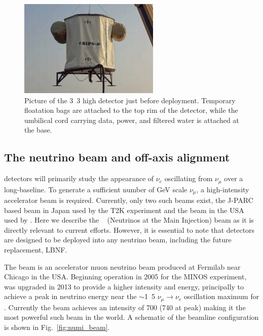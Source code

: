 \begin{figure} %
    \includegraphics[width=0.6\textwidth]{diagrams/4-chips/chips_m.png}
    \caption[Picture of the \chipsm detector]
    {Picture of the \unit{3.3}{} high \chipsm detector just before deployment. Temporary
        floatation bags are attached to the top rim of the detector, while the umbilical cord
        carrying data, power, and filtered water is attached at the base.}
    \label{fig:chips_m}
\end{figure}

\subsection{The neutrino beam and off-axis alignment} %
\label{sec:chips_concept_beam} %

\chips detectors will primarily study the appearance of $\nu_{e}$ oscillating from $\nu_{\mu}$
over a long-baseline. To generate a sufficient number of GeV scale $\nu_{\mu}$, a high-intensity
accelerator beam is required. Currently, only two such beams exist, the J-PARC based beam in Japan
used by the T2K experiment and the \numi beam in the USA used by \nova. Here we describe the
\numi~\cite{adamson2016} (Neutrinos at the Main Injection) beam as it is directly relevant to
current \chips efforts. However, it is essential to note that \chips detectors are designed to be
deployed into any neutrino beam, including the future \numi replacement, LBNF.

The \numi beam is an accelerator muon neutrino beam produced at Fermilab near Chicago in the USA.
Beginning operation in 2005 for the MINOS experiment, \numi was upgraded in 2013 to provide a
higher intensity and energy, principally to achieve a peak in neutrino energy near the
$\sim$\unit{1.5}{\GeV} $\nu_{\mu}\rightarrow\nu_{e}$ oscillation maximum for \nova. Currently the
\numi beam achieves an intensity of \unit{700}{} (\unit{740}{} at peak)
making it the most powerful such beam in the world. A schematic of the \numi beamline
configuration is shown in Fig.~\ref{fig:numi_beam}.


